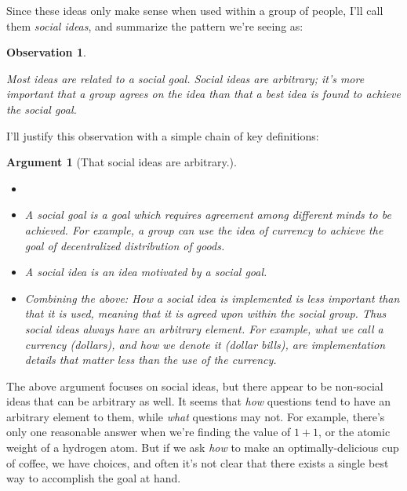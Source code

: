 \documentclass[11pt, oneside]{article}   	%
\newtheorem{obs}{Observation}
\newtheorem{argt}{Argument}
\begin{document}
Since these ideas only make sense when used within a group of people,
I'll call them {\em
social ideas}, and summarize the pattern we're seeing as:
\newcommand{\obseight}{
    Most ideas are related to a social goal.
    Social ideas are {\em arbitrary}; it's more important that a group agrees on
    the idea than that a best idea is found to achieve the social goal.
}
\begin{obs}\label{o8}
    \obseight
\end{obs}

I'll justify this observation with a simple chain of key definitions:

\begin{argt}[That social ideas are arbitrary.]
    \label{a5}
    \normalfont
    \begin{itemize}
        \item[]
        \item A social {\em goal}
            is a goal which requires agreement among different
            minds to be achieved. For example, a group can use the idea
            of {\em currency}
            to achieve the goal of decentralized distribution of goods.
        \item A social {\em idea} is an idea motivated by a social goal.
        \item Combining the above:
            {\em How} a social idea is implemented is less important than
            {\em that} it is
            used, meaning that it is agreed upon within the social group.
            Thus social ideas always have an arbitrary element.
            For example, what we call a
            currency (dollars), and how we denote it (dollar bills), are
            implementation details that matter less than the use of the
            currency.
    \end{itemize}
\end{argt}


The above argument focuses on social ideas, but there appear to be
non-social ideas that can be arbitrary as well.
It seems that {\em how} questions tend to have an arbitrary element
to them, while {\em what} questions may not.
For example, there's only one reasonable answer when we're finding
the value of $1+1$,
or the
atomic weight of a hydrogen atom.
But if we ask {\em how} to make an optimally-delicious cup of coffee,
we have choices, and often it's not clear that there exists a single
best way to accomplish the goal at hand.
\end{document}
